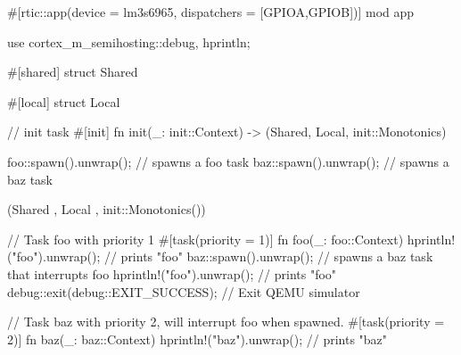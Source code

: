 #[rtic::app(device = lm3s6965, dispatchers = [GPIOA,GPIOB])]
mod app {
    use cortex_m_semihosting::{debug, hprintln};

    #[shared]
    struct Shared {}

    #[local]
    struct Local {}

    // init task
    #[init]
    fn init(_: init::Context) -> (Shared, Local, init::Monotonics) {
        foo::spawn().unwrap(); // spawns a foo task
        baz::spawn().unwrap(); // spawns a baz task

        (Shared {}, Local {}, init::Monotonics())
    }

    // Task foo with priority 1
    #[task(priority = 1)]
    fn foo(_: foo::Context) {
        hprintln!("foo").unwrap(); // prints "foo"
        baz::spawn().unwrap();     // spawns a baz task that interrupts foo
        hprintln!("foo").unwrap(); // prints "foo"
        debug::exit(debug::EXIT_SUCCESS); // Exit QEMU simulator
    }

    // Task baz with priority 2, will interrupt foo when spawned.
    #[task(priority = 2)]
    fn baz(_: baz::Context) {
        hprintln!("baz").unwrap(); // prints "baz"
    }
}
